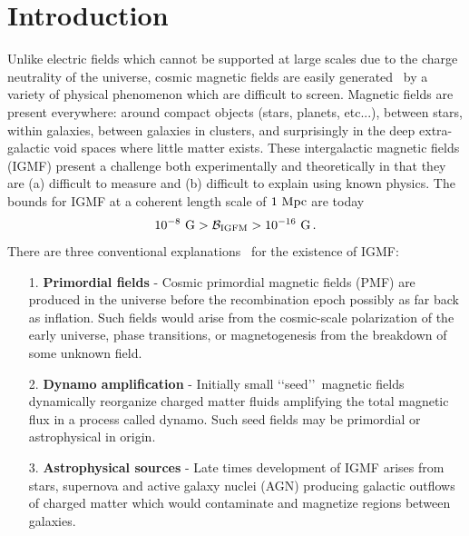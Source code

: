 \documentclass[a4paper]{article}
\begin{document}
\section{Introduction}\label{sec:introduction}
\noindent Unlike electric fields which cannot be supported at large scales due to the charge neutrality of the universe, cosmic magnetic fields are easily generated~\cite{kronberg1994extragalactic,gaensler2004origin,durrer2013cosmological} by a variety of physical phenomenon which are difficult to screen. Magnetic fields are present everywhere: around compact objects (stars, planets, etc...), between stars, within galaxies, between galaxies in clusters, and surprisingly in the deep extra-galactic void spaces where little matter exists. These intergalactic magnetic fields (IGMF) present a challenge both experimentally and theoretically in that they are (a) difficult to measure and (b) difficult to explain using known physics. The bounds for IGMF at a coherent length scale of $1{\rm\ Mpc}$ are today~\cite{neronov2010evidence,taylor2011extragalactic,pshirkov2015new,vernstrom2021discovery}
\begin{align}
    \label{igmf}
    10^{-8}{\rm\ G}>\mathcal{B}_{\rm IGFM}>10^{-16}{\rm\ G}\,.
\end{align}
There are three conventional explanations~\cite{batista2021gammaray} for the existence of IGMF:
\begin{itemize}
    \item [1.] \textbf{Primordial fields} - Cosmic primordial magnetic fields (PMF) are produced in the universe before the recombination epoch possibly as far back as inflation. Such fields would arise from the cosmic-scale polarization of the early universe, phase transitions, or magnetogenesis from the breakdown of some unknown field.
    \item [2.] \textbf{Dynamo amplification} - Initially small \lq\lq seed\rq\rq\ magnetic fields dynamically reorganize charged matter fluids amplifying the total magnetic flux in a process called dynamo. Such seed fields may be primordial or astrophysical in origin.
    \item [3.] \textbf{Astrophysical sources} - Late times development of IGMF arises from stars, supernova and active galaxy nuclei (AGN) producing galactic outflows of charged matter which would contaminate and magnetize regions between galaxies.
\end{itemize}
\end{document}
